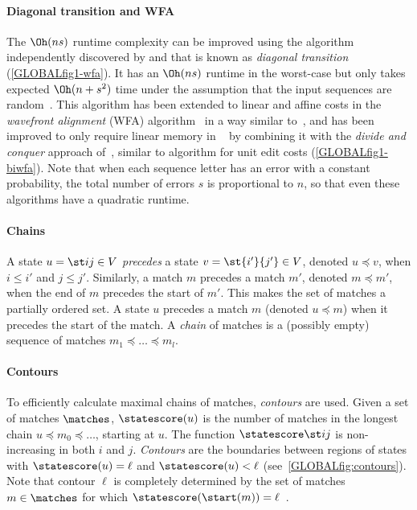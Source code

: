 \paragraph{Diagonal transition and WFA}
The $\Oh(ns)$ runtime complexity can be improved using the algorithm independently
discovered by \citet{ukkonen1985algorithms} and \citet{myers1986ano} that is
known as \emph{diagonal transition} \citep{navarro2001guided} (\cref{GLOBALfig1-wfa}).
It has an $\Oh(ns)$ runtime in the worst-case but only takes expected
$\Oh(n+s^2)$ time under the assumption that the input sequences are
random~\citep{myers1986ano}. This algorithm has been extended to linear and
affine costs in the \emph{wavefront alignment} (WFA)
algorithm~\citep{marco2021fast} in a way similar to~\citet{gotoh1982improved},
and has been improved to only require linear memory in
\wfa~\citep{marco2022optimal} by combining it with the \emph{divide and conquer}
approach of~\citet{hirschberg1975linear}, similar to \citet{myers1986ano}
algorithm for unit edit costs (\cref{GLOBALfig1-biwfa}).
Note that when each sequence letter has an error with a constant probability,
the total number of errors $s$ is proportional to $n$, so that even these
algorithms have a quadratic runtime.

\paragraph{Chains}
A state $u=\st ij\in V$ \emph{precedes} a state $v=\st {i'}{j'}\in V$, denoted
$u\preceq v$, when $i\leq i'$ and $j\leq j'$. Similarly, a match $m$ precedes a
match $m'$, denoted $m\preceq m'$, when the end of $m$ precedes the start of
$m'$. This makes the set of matches a partially ordered set.
A state $u$ precedes a match $m$ (denoted $u\preceq m$) when it precedes
the start of the match. A \emph{chain} of matches is a (possibly empty) sequence
of matches $m_1 \preceq \dots \preceq m_l$.

\paragraph{Contours}
To efficiently calculate maximal chains of matches, \emph{contours} are used.
Given a set of matches $\matches$, $\statescore(u)$ is the number of matches in
the longest chain $u\preceq m_0 \preceq \dots$, starting at $u$. The function
$\statescore\st ij$ is non-increasing in both $i$ and $j$. \emph{Contours} are
the boundaries between regions of states with $\statescore(u) = \ell$ and
$\statescore(u)<\ell$ (see~\cref{GLOBALfig:contours}). Note that contour $\ell$ is
completely determined by the set of matches $m\in \matches$ for which
${\statescore(\start(m)) = \ell}$~\citep{hirschberg1977algorithms}.


